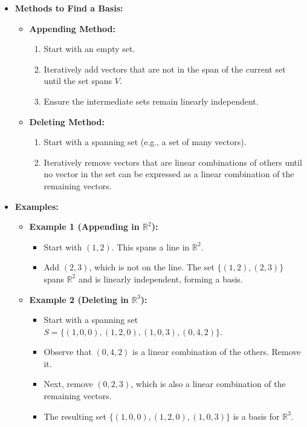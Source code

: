\documentclass{article}
\begin{document}
\begin{itemize}
  \item \textbf{Methods to Find a Basis:}
    \begin{itemize}
      \item \textbf{Appending Method:}
        \begin{enumerate}
          \item Start with an empty set.
          \item Iteratively add vectors that are not in the span of the current set until the set spans $V$.
          \item Ensure the intermediate sets remain linearly independent.
        \end{enumerate}
      \item \textbf{Deleting Method:}
        \begin{enumerate}
          \item Start with a spanning set (e.g., a set of many vectors).
          \item Iteratively remove vectors that are linear combinations of others until no vector in the set can be expressed as a linear combination of the remaining vectors.
        \end{enumerate}
    \end{itemize}

  \item \textbf{Examples:}
    \begin{itemize}
      \item \textbf{Example 1 (Appending in $\mathbb{R}^2$):}
        \begin{itemize}
          \item Start with $(1, 2)$. This spans a line in $\mathbb{R}^2$.
          \item Add $(2, 3)$, which is not on the line. The set $\{(1, 2), (2, 3)\}$ spans $\mathbb{R}^2$ and is linearly independent, forming a basis.
        \end{itemize}
      \item \textbf{Example 2 (Deleting in $\mathbb{R}^3$):}
        \begin{itemize}
          \item Start with a spanning set $S = \{(1, 0, 0), (1, 2, 0), (1, 0, 3), (0, 4, 2)\}$.
          \item Observe that $(0, 4, 2)$ is a linear combination of the others. Remove it.
          \item Next, remove $(0, 2, 3)$, which is also a linear combination of the remaining vectors.
          \item The resulting set $\{(1, 0, 0), (1, 2, 0), (1, 0, 3)\}$ is a basis for $\mathbb{R}^3$.
        \end{itemize}
    \end{itemize}


\end{itemize}
\end{document}
